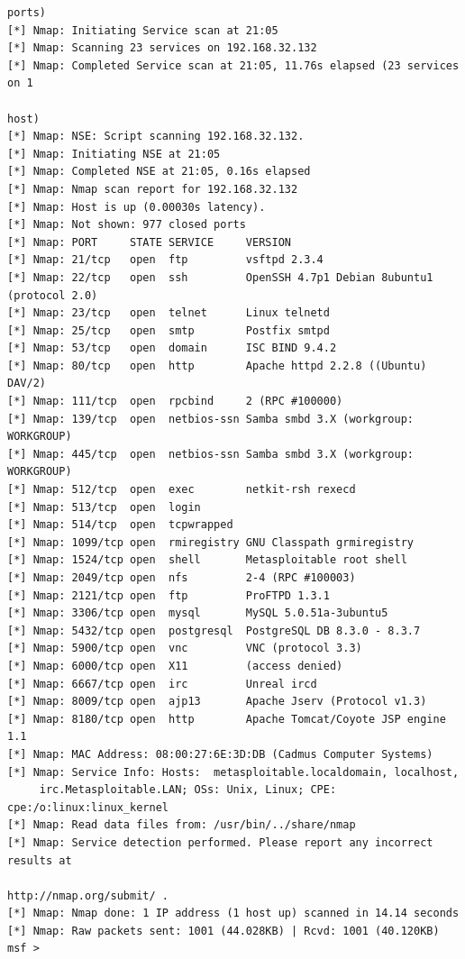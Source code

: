 \documentclass[a4paper, 14pt]{article}				%
\begin{document}
\begin{Verbatim}[frame=single]
                                                                       ports)
[*] Nmap: Initiating Service scan at 21:05
[*] Nmap: Scanning 23 services on 192.168.32.132
[*] Nmap: Completed Service scan at 21:05, 11.76s elapsed (23 services on 1
                                                                        host)
[*] Nmap: NSE: Script scanning 192.168.32.132.
[*] Nmap: Initiating NSE at 21:05
[*] Nmap: Completed NSE at 21:05, 0.16s elapsed
[*] Nmap: Nmap scan report for 192.168.32.132
[*] Nmap: Host is up (0.00030s latency).
[*] Nmap: Not shown: 977 closed ports
[*] Nmap: PORT     STATE SERVICE     VERSION
[*] Nmap: 21/tcp   open  ftp         vsftpd 2.3.4
[*] Nmap: 22/tcp   open  ssh         OpenSSH 4.7p1 Debian 8ubuntu1 (protocol 2.0)
[*] Nmap: 23/tcp   open  telnet      Linux telnetd
[*] Nmap: 25/tcp   open  smtp        Postfix smtpd
[*] Nmap: 53/tcp   open  domain      ISC BIND 9.4.2
[*] Nmap: 80/tcp   open  http        Apache httpd 2.2.8 ((Ubuntu) DAV/2)
[*] Nmap: 111/tcp  open  rpcbind     2 (RPC #100000)
[*] Nmap: 139/tcp  open  netbios-ssn Samba smbd 3.X (workgroup: WORKGROUP)
[*] Nmap: 445/tcp  open  netbios-ssn Samba smbd 3.X (workgroup: WORKGROUP)
[*] Nmap: 512/tcp  open  exec        netkit-rsh rexecd
[*] Nmap: 513/tcp  open  login
[*] Nmap: 514/tcp  open  tcpwrapped
[*] Nmap: 1099/tcp open  rmiregistry GNU Classpath grmiregistry
[*] Nmap: 1524/tcp open  shell       Metasploitable root shell
[*] Nmap: 2049/tcp open  nfs         2-4 (RPC #100003)
[*] Nmap: 2121/tcp open  ftp         ProFTPD 1.3.1
[*] Nmap: 3306/tcp open  mysql       MySQL 5.0.51a-3ubuntu5
[*] Nmap: 5432/tcp open  postgresql  PostgreSQL DB 8.3.0 - 8.3.7
[*] Nmap: 5900/tcp open  vnc         VNC (protocol 3.3)
[*] Nmap: 6000/tcp open  X11         (access denied)
[*] Nmap: 6667/tcp open  irc         Unreal ircd
[*] Nmap: 8009/tcp open  ajp13       Apache Jserv (Protocol v1.3)
[*] Nmap: 8180/tcp open  http        Apache Tomcat/Coyote JSP engine 1.1
[*] Nmap: MAC Address: 08:00:27:6E:3D:DB (Cadmus Computer Systems)
[*] Nmap: Service Info: Hosts:  metasploitable.localdomain, localhost, 
     irc.Metasploitable.LAN; OSs: Unix, Linux; CPE: cpe:/o:linux:linux_kernel
[*] Nmap: Read data files from: /usr/bin/../share/nmap
[*] Nmap: Service detection performed. Please report any incorrect results at
                                                    http://nmap.org/submit/ .
[*] Nmap: Nmap done: 1 IP address (1 host up) scanned in 14.14 seconds
[*] Nmap: Raw packets sent: 1001 (44.028KB) | Rcvd: 1001 (40.120KB)
msf > 
\end{Verbatim}
\end{document}
